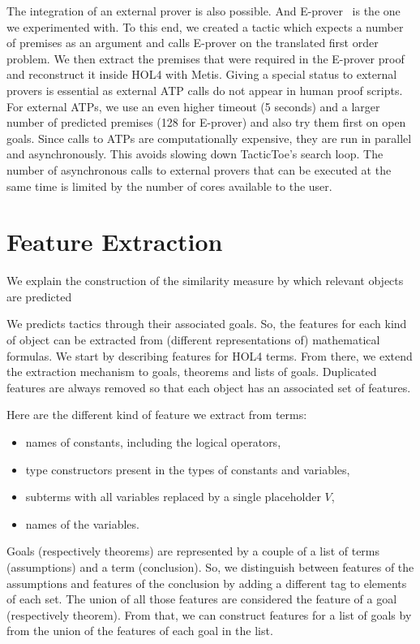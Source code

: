 \documentclass[runningheads,a4paper,draft]{svjour3}
\def\holfour{\textsf{HOL4}\xspace}
\def\eprover{\textsf{E-prover}\xspace}
\def\metis{\textsf{Metis}\xspace}
\def\tactictoe{\textsf{TacticToe}\xspace}
\begin{document}
The integration of an external prover is also possible. And
\eprover~\cite{eprover} is the one we experimented with.
To this end, we created a tactic which expects a number of premises as an
argument
and calls \eprover on the translated first order problem. We then extract the
premises that were required in the \eprover
proof and reconstruct it inside \holfour with \metis. Giving a special status
to external
provers is essential as external ATP calls do not appear in human
proof scripts. For external ATPs, we use an even higher timeout (5 seconds) and
a larger number of predicted premises (128 for \eprover) and also try them
first on open
goals. Since calls to ATPs are
computationally expensive, they are run in parallel and asynchronously. This
avoids slowing down \tactictoe's search loop. The number of asynchronous calls
to external provers that can be executed at the same time is limited by the
number of cores available to the user.





\section{Feature Extraction}\label{sec:features}
We explain the construction of the similarity measure by which relevant
objects are predicted

We predicts tactics through their associated goals. So, the features
for each kind of object can be extracted from (different representations of)
mathematical formulas. We start by describing features for \holfour terms. From
there, we extend the extraction mechanism
to goals, theorems and lists of goals. Duplicated features are always removed
so that each object has an associated set of features.

Here are the different kind of feature we extract from terms:
\begin{itemize}
\item names of constants, including the logical operators,
\item type constructors present in the types of constants and variables,
\item subterms with all variables replaced by a single placeholder $V$,
\item names of the variables.
\end{itemize}
Goals (respectively theorems) are represented by a couple of a list of
terms (assumptions) and a term (conclusion). So, we distinguish between
features of the assumptions and features of the conclusion by adding a
different tag to elements of each set. The union of all those
features are considered the feature of a goal (respectively theorem). From
that, we can construct features for a list of goals by
from the union of the features of each goal in the list.
\end{document}
